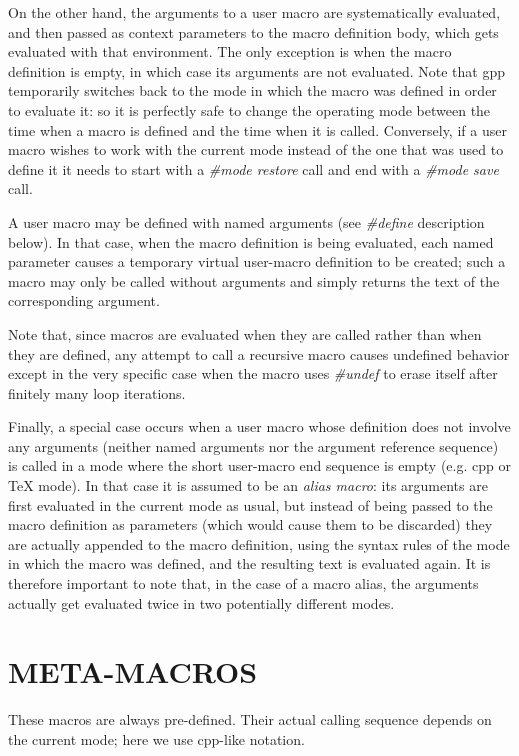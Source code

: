 On the other hand, the arguments to a user macro are systematically evaluated,
and then passed as context parameters to the macro definition body, which gets
evaluated with that environment. The only exception is when the macro
definition is empty, in which case its arguments are not evaluated. Note that
gpp temporarily switches back to the mode in which the macro was defined in
order to evaluate it: so it is perfectly safe to change the operating mode
between the time when a macro is defined and the time when it is called.
Conversely, if a user macro wishes to work with the current mode instead of
the one that was used to define it it needs to start with a {\it \#mode
restore} call and end with a {\it \#mode save} call. 

A user macro may be defined with named arguments (see {\it \#define}
description below). In that case, when the macro definition is being
evaluated, each named parameter causes a temporary virtual user-macro
definition to be created; such a macro may only be called without arguments
and simply returns the text of the corresponding argument. 

Note that, since macros are evaluated when they are called rather than when
they are defined, any attempt to call a recursive macro causes undefined
behavior except in the very specific case when the macro uses {\it \#undef} to
erase itself after finitely many loop iterations. 

Finally, a special case occurs when a user macro whose definition does not
involve any arguments (neither named arguments nor the argument reference
sequence) is called in a mode where the short user-macro end sequence is empty
(e.g. cpp or TeX mode). In that case it is assumed to be an {\it alias macro}:
its arguments are first evaluated in the current mode as usual, but instead of
being passed to the macro definition as parameters (which would cause them to
be discarded) they are actually appended to the macro definition, using the
syntax rules of the mode in which the macro was defined, and the resulting
text is evaluated again. It is therefore important to note that, in the case
of a macro alias, the arguments actually get evaluated twice in two
potentially different modes. 

\htmlHR

\section{META-MACROS}

These macros are always pre-defined. Their actual calling sequence depends on
the current mode; here we use cpp-like notation. 

